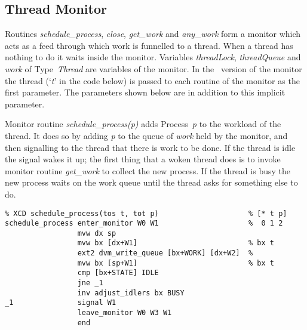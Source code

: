 \subsection{Thread Monitor}\label{threadmonitor}
Routines \emph{schedule\_process}, \emph{close}, \emph{get\_work} and \emph{any\_work} form a monitor which acts as a feed through which work is funnelled to a thread. When a thread has nothing to do it waits inside the monitor. Variables \emph{threadLock}, \emph{threadQueue} and \emph{work} of Type~\emph{Thread} are variables of the monitor.
In the \dvmasm\ version of the monitor the thread (`\emph{t}' in the code below) is passed to each routine of the monitor as the first parameter. The parameters shown below are in addition to this implicit parameter.

Monitor routine \emph{schedule\_process(p)} adds Process~\emph{p} to the workload of the thread. It does so by adding \emph{p} to the queue of \emph{work} held by the monitor, and then signalling to the thread that there is work to be done. If the thread is idle the signal wakes it up;  the first thing that a woken thread does is to invoke monitor routine \emph{get\_work} to collect the new process. If the thread is busy the new process waits on the work queue until the thread asks for something else to do.

\begin{tabbing}
\indents
{}
\ooooo{}
\finmore
\end{tabbing}

{\small
\begin{verbatim}
% XCD schedule_process(tos t, tot p)                     % [* t p]
schedule_process enter_monitor W0 W1                     %  0 1 2
                 mvw dx sp
                 mvw bx [dx+W1]                          % bx t
                 ext2 dvm_write_queue [bx+WORK] [dx+W2]  %
                 mvw bx [sp+W1]                          % bx t
                 cmp [bx+STATE] IDLE
                 jne _1
                 inv adjust_idlers bx BUSY
_1               signal W1
                 leave_monitor W0 W3 W1
                 end
\end{verbatim}}


